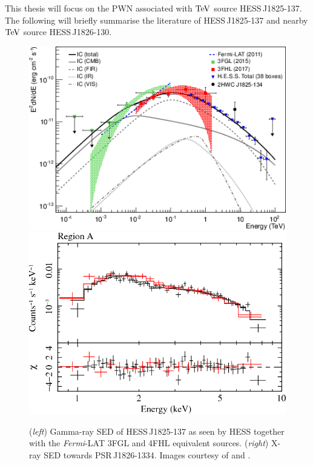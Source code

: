This thesis will focus on the PWN associated with $\TeV$ source \mbox{HESS\,J1825-137}. The following will briefly summarise the literature of \mbox{HESS\,J1825-137} and nearby $\TeV$ source \mbox{HESS\,J1826-130}.
\newpar
\begin{figure}[h!]
	\centering
	\includegraphics[height=0.2\textheight]{04_Introduction/Images/pulsar_wind_nebula/1825_energy_flux.png}
    \includegraphics[height=0.2\textheight]{04_Introduction/Images/pulsar_wind_nebula/1825_xray_flux.png}
    \caption{(\textit{left}) Gamma-ray SED of \mbox{HESS\,J1825-137} as seen by HESS together with the \textit{Fermi}-LAT 3FGL and 4FHL equivalent sources. (\textit{right}) X-ray SED towards \mbox{PSR\,J1826-1334}. Images courtesy of \cite{2019A&A...621A.116H} and \cite{2009PASJ...61S.189U}.}
    \label{fig:chapter1_hess_j1825_morphology_paramaters}
\end{figure}
